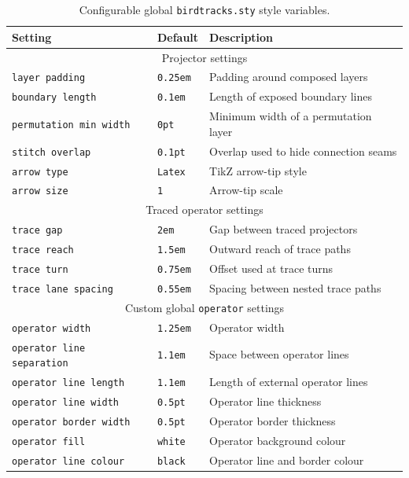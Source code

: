 \documentclass{article}
\begin{document}
\begin{table}[!h!]
    \centering
        \caption{Configurable global \texttt{birdtracks.sty} style variables.}
   \begin{tabular}{@{}p{.28\linewidth}p{.18\linewidth}p{.46\linewidth}@{}}
\hline
Setting & Default & Description \\
\hline
\multicolumn{3}{c}{Projector settings}\\
\hline
\texttt{layer padding} & \texttt{0.25em} & Padding around composed layers \\
\texttt{boundary length} & \texttt{0.1em} & Length of exposed boundary lines \\
\texttt{permutation min width} & \texttt{0pt} & Minimum width of a permutation layer \\
\texttt{stitch overlap} & \texttt{0.1pt} & Overlap used to hide connection seams \\
\texttt{arrow type} & \texttt{Latex} & TikZ arrow-tip style \\
\texttt{arrow size} & \texttt{1} & Arrow-tip scale \\
\hline
\multicolumn{3}{c}{Traced operator settings}\\
\hline
\texttt{trace gap} & \texttt{2em} & Gap between traced projectors \\
\texttt{trace reach} & \texttt{1.5em} & Outward reach of trace paths \\
\texttt{trace turn} & \texttt{0.75em} & Offset used at trace turns \\
\texttt{trace lane spacing} & \texttt{0.55em} & Spacing between nested trace paths \\
\hline
\multicolumn{3}{c}{Custom global \texttt{operator} settings}\\
\hline
\texttt{operator width}& \texttt{1.25em} & Operator width \\
\texttt{operator line separation} & \texttt{1.1em} & Space between operator lines \\
\texttt{operator line length} & \texttt{1.1em} & Length of external operator lines \\
\texttt{operator line width} & \texttt{0.5pt} & Operator line thickness \\
\texttt{operator border width} & \texttt{0.5pt} & Operator border thickness \\
\texttt{operator fill} & \texttt{white} & Operator background colour \\
\texttt{operator line colour} & \texttt{black} & Operator line and border colour \\

\end{tabular}
\end{table}
\end{document}
